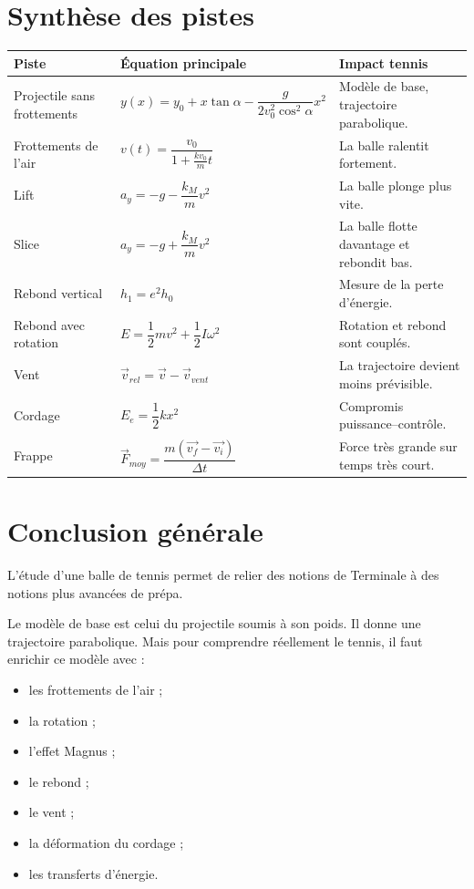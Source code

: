 \documentclass[11pt,a4paper]{article}
\begin{document}
\section{Synthèse des pistes}

\begin{center}
\renewcommand{\arraystretch}{1.5}
\begin{tabular}{p{3.5cm}p{5cm}p{5.5cm}}
\toprule
\textbf{Piste} & \textbf{Équation principale} & \textbf{Impact tennis} \\
\midrule
Projectile sans frottements
&
$y(x)=y_0+x\tan\alpha-\dfrac{g}{2v_0^2\cos^2\alpha}x^2$
&
Modèle de base, trajectoire parabolique.
\\
\midrule
Frottements de l'air
&
$v(t)=\dfrac{v_0}{1+\frac{kv_0}{m}t}$
&
La balle ralentit fortement.
\\
\midrule
Lift
&
$a_y=-g-\dfrac{k_M}{m}v^2$
&
La balle plonge plus vite.
\\
\midrule
Slice
&
$a_y=-g+\dfrac{k_M}{m}v^2$
&
La balle flotte davantage et rebondit bas.
\\
\midrule
Rebond vertical
&
$h_1=e^2h_0$
&
Mesure de la perte d'énergie.
\\
\midrule
Rebond avec rotation
&
$E=\dfrac12mv^2+\dfrac12I\omega^2$
&
Rotation et rebond sont couplés.
\\
\midrule
Vent
&
$\vec{v}_{rel}=\vec{v}-\vec{v}_{vent}$
&
La trajectoire devient moins prévisible.
\\
\midrule
Cordage
&
$E_e=\dfrac12kx^2$
&
Compromis puissance--contrôle.
\\
\midrule
Frappe
&
$\vec{F}_{moy}=\dfrac{m(\vec{v_f}-\vec{v_i})}{\Delta t}$
&
Force très grande sur temps très court.
\\
\bottomrule
\end{tabular}
\end{center}

\section{Conclusion générale}

L'étude d'une balle de tennis permet de relier des notions de Terminale à des notions plus avancées de prépa.

Le modèle de base est celui du projectile soumis à son poids. Il donne une trajectoire parabolique. Mais pour comprendre réellement le tennis, il faut enrichir ce modèle avec :
\begin{itemize}
    \item les frottements de l'air ;
    \item la rotation ;
    \item l'effet Magnus ;
    \item le rebond ;
    \item le vent ;
    \item la déformation du cordage ;
    \item les transferts d'énergie.
\end{itemize}
\end{document}
